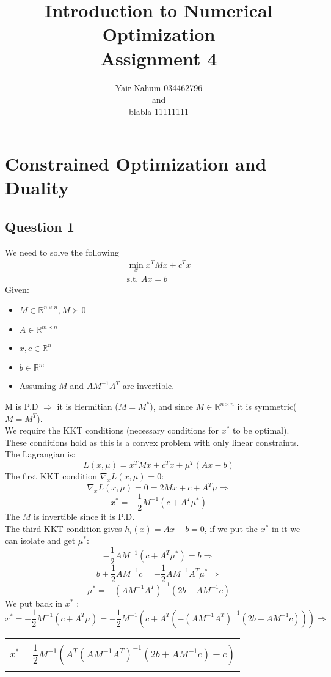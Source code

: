 \documentclass[12pt]{article}
\title{Introduction to Numerical Optimization\\Assignment 4}
\author{Yair Nahum 034462796\\and\\blabla 11111111 }
\newcommand{\rectres}[1]{
\begin{center}
\begin{tabular}{ |c| }
\hline
\\
 #1\\
 \\
\hline
\end{tabular}
\end{center}
}
\begin{document}
\maketitle


\section{Constrained Optimization and Duality}

\subsection{Question 1}
We need to solve the following 
\begin{equation}
\label{eq:min1}
\begin{split}
    \min _x x^T M x + c^T x \\
    \text{s.t. } Ax = b
\end{split}
\end{equation}
Given:
\begin{itemize}
  \item $M \in \mathbb{R}^{n\times n},M \succ 0$
  \item $A \in \mathbb{R}^{m\times n}$
  \item $x,c \in \mathbb{R}^{n}$
  \item $b \in \mathbb{R}^{m}$
  \item Assuming $M$ and $AM^{-1}A^T$ are invertible.
\end{itemize}
M is P.D $\Rightarrow$ it is Hermitian ($M=M^*$), and since $M \in \mathbb{R}^{n\times n}$ it is symmetric($M=M^T$).\\
We require the KKT conditions (necessary conditions for $x^*$ to be optimal).\\
These conditions hold as this is a convex problem with only linear constraints.
The Lagrangian is:
$$L(x,\mu)=x^T M x + c^T x + \mu^T(Ax-b)$$
The first KKT condition $\nabla_x L(x,\mu)=0$:
$$\nabla_x L(x,\mu)=0 = 2Mx + c + A^T\mu \Rightarrow$$
$$x^* = -\frac{1}{2}M^{-1}(c + A^T\mu^*)$$
The $M$ is invertible since it is P.D.\\
The third KKT condition gives $h_i(x)=Ax-b=0$, if we put the $x^*$ in it we can isolate and get $\mu^*$:\\
$$-\frac{1}{2}AM^{-1}(c + A^T\mu^*) = b \Rightarrow$$
$$b+\frac{1}{2}AM^{-1}c = -\frac{1}{2}AM^{-1}A^T\mu^* \Rightarrow$$
$$\mu^* = -(AM^{-1}A^T)^{-1}(2b+AM^{-1}c)$$
We put back in $x^*$ :\\
$$x^* = -\frac{1}{2}M^{-1}(c + A^T\mu) =-\frac{1}{2}M^{-1}(c + A^T(-(AM^{-1}A^T)^{-1}(2b+AM^{-1}c))) \Rightarrow $$
\rectres{$$x^* =  \frac{1}{2}M^{-1}(A^T(AM^{-1}A^T)^{-1}(2b+AM^{-1}c)-c)$$}
\newpage
\end{document}
